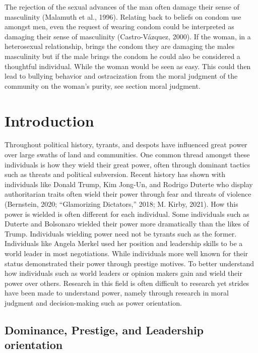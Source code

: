 \documentclass[
  donotrepeattitle,doc, 12pt, a4paper,floatsintext]{apa7}
\begin{document}
The rejection of the sexual advances of the man often damage their sense of masculinity (Malamuth et al., 1996). Relating back to beliefs on condom use amongst men, even the request of wearing condom could be interpreted as damaging their sense of masculinity (Castro-Vázquez, 2000). If the woman, in a heterosexual relationship, brings the condom they are damaging the males masculinity but if the male brings the condom he could also be considered a thoughtful individual. While the woman would be seen as easy. This could then lead to bullying behavior and ostracization from the moral judgment of the community on the woman's purity, see section moral judgment.
\newpage

\hypertarget{introduction}{%
\section{Introduction}\label{introduction}}

Throughout political history, tyrants, and despots have influenced great power over large swaths of land and communities. One common thread amongst these individuals is how they wield their great power, often through dominant tactics such as threats and political subversion. Recent history has shown with individuals like Donald Trump, Kim Jong-Un, and Rodrigo Duterte who display authoritarian traits often wield their power through fear and threats of violence (Bernstein, 2020; {``Glamorizing Dictators,''} 2018; M. Kirby, 2021). How this power is wielded is often different for each individual. Some individuals such as Duterte and Bolsonaro wielded their power more dramatically than the likes of Trump. Individuals wielding power need not be tyrants such as the former. Individuals like Angela Merkel used her position and leadership skills to be a world leader in most negotiations. While individuals more well known for their status demonstrated their power through prestige motives. To better understand how individuals such as world leaders or opinion makers gain and wield their power over others. Research in this field is often difficult to research yet strides have been made to understand power, namely through research in moral judgment and decision-making such as power orientation.

\hypertarget{dominance-prestige-and-leadership-orientation}{%
\subsection{Dominance, Prestige, and Leadership orientation}\label{dominance-prestige-and-leadership-orientation}}
\end{document}

